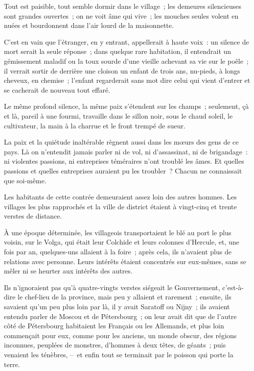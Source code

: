 \documentclass[french,twoside]{book} %
\begin{document}
Tout est paisible, tout semble dormir dans le village ; les demeures silencieuses sont grandes ouvertes ; on ne voit âme qui vive ; les mouches seules volent en nuées et bourdonnent dans l’air lourd de la maisonnette.\par
C’est en vain que l’étranger, en y entrant, appellerait à haute voix : un silence de mort serait la seule réponse ; dans quelque rare habitation, il entendrait un gémissement maladif ou la toux sourde d’une vieille achevant sa vie sur le poêle ; il verrait sortir de derrière une cloison un enfant de trois ans, nu-pieds, à longs cheveux, en chemise ; l’enfant regarderait sans mot dire celui qui vient d’entrer et se cacherait de nouveau tout effaré.\par
Le même profond silence, la même paix s’étendent sur les champs ; seulement, çà et là, pareil à une fourmi, travaille dans le sillon noir, sous le chaud soleil, le cultivateur, la main à la charrue et le front trempé de sueur.\par
La paix et la quiétude inaltérable règnent aussi dans les mœurs des gens de ce pays. Là on n’entendit jamais parler ni de vol, ni d’assassinat, ni de brigandage : ni violentes passions, ni entreprises téméraires n’ont troublé les âmes. Et quelles passions et quelles entreprises auraient pu les troubler ? Chacun ne connaissait que soi-même.\par
Les habitants de cette contrée demeuraient assez loin des autres hommes. Les villages les plus rapprochés et la ville de district étaient à vingt-cinq et trente verstes de distance.\par
À une époque déterminée, les villageois transportaient le blé au port le plus voisin, sur le Volga, qui était leur Colchide et leurs colonnes d’Hercule, et, une fois par an, quelques-uns allaient à la foire ; après cela, ils n’avaient plus de relations avec personne. Leurs intérêts étaient concentrés sur eux-mêmes, sans se mêler ni se heurter aux intérêts des autres.\par
Ils n’ignoraient pas qu’à quatre-vingts verstes siégeait le Gouvernement, c’est-à-dire le chef-lieu de la province, mais peu y allaient et rarement ; ensuite, ils savaient qu’un peu plus loin par là, il y avait Saratoff ou Nijny ; ils avaient entendu parler de Moscou et de Pétersbourg ; on leur avait dit que de l’autre côté de Pétersbourg habitaient les Français ou les Allemands, et plus loin commençait pour eux, comme pour les anciens, un monde obscur, des régions inconnues, peuplées de monstres, d’hommes à deux têtes, de géants ; puis venaient les ténèbres, – et enfin tout se terminait par le poisson qui porte la terre.\par
\end{document}
